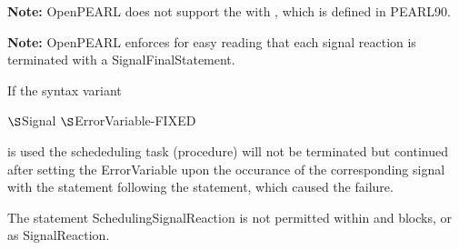 \begin{grammarframe}



%
\end{grammarframe}

\textbf{Note:} OpenPEARL does not support the  with , which is defined in PEARL90.

\textbf{Note:} OpenPEARL enforces for easy reading that each signal reaction is terminated with a SignalFinalStatement.

If the syntax variant 

\x {} $\S $Signal  \kw{(} $\S $ErrorVariable-FIXED \kw{)} \kw{;}

is used the schededuling task (procedure) will not be terminated 
but continued after setting the ErrorVariable upon the occurance 
of the corresponding signal with the statement following the 
statement, which caused the failure.



The statement SchedulingSignalReaction is not permitted within 
and  blocks, or as SignalReaction.

